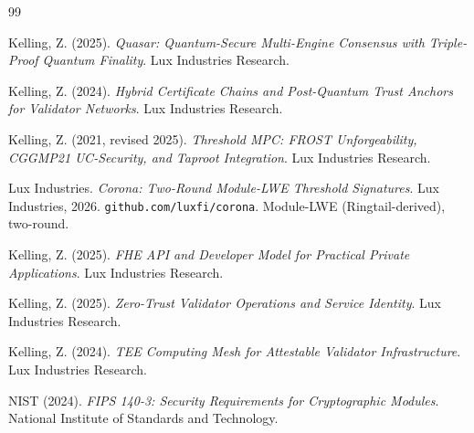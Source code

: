\documentclass[11pt]{article}
\begin{document}
\begin{thebibliography}{99}

Kelling, Z. (2025).
\textit{Quasar: Quantum-Secure Multi-Engine Consensus with Triple-Proof Quantum Finality}.
Lux Industries Research.

Kelling, Z. (2024).
\textit{Hybrid Certificate Chains and Post-Quantum Trust Anchors for Validator Networks}.
Lux Industries Research.

Kelling, Z. (2021, revised 2025).
\textit{Threshold MPC: FROST Unforgeability, CGGMP21 UC-Security, and Taproot Integration}.
Lux Industries Research.

{Lux Industries}.
\textit{Corona: Two-Round Module-LWE Threshold Signatures}.
Lux Industries, 2026. \texttt{github.com/luxfi/corona}.
Module-LWE (Ringtail-derived), two-round.

Kelling, Z. (2025).
\textit{FHE API and Developer Model for Practical Private Applications}.
Lux Industries Research.

Kelling, Z. (2025).
\textit{Zero-Trust Validator Operations and Service Identity}.
Lux Industries Research.

Kelling, Z. (2024).
\textit{TEE Computing Mesh for Attestable Validator Infrastructure}.
Lux Industries Research.

NIST (2024).
\textit{FIPS 140-3: Security Requirements for Cryptographic Modules}.
National Institute of Standards and Technology.

\end{thebibliography}
\end{document}
